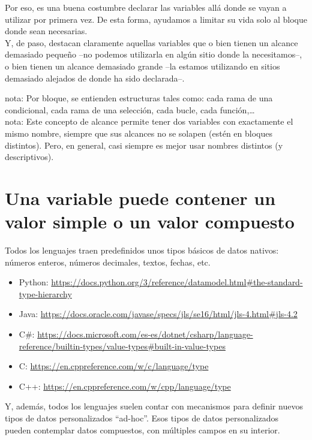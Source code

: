 \documentclass[spanish,12pt,a4paper,final,oneside]{book}
\begin{document}
\vspace{1cm}
Por eso, es una buena costumbre declarar las variables allá donde se vayan a utilizar por primera vez. De esta forma, ayudamos a limitar su vida solo al bloque donde sean necesarias. 
\\Y, de paso, destacan claramente aquellas variables que o bien tienen un alcance demasiado pequeño --no podemos utilizarla en algún sitio donde la necesitamos--, o bien tienen un alcance demasiado grande --la estamos utilizando en sitios demasiado alejados de donde ha sido declarada--.

nota: Por bloque, se entienden estructuras tales como: cada rama de una condicional, cada rama de una selección, cada bucle, cada función,\ldots
\\nota: Este concepto de alcance permite tener dos variables con exactamente el mismo nombre, siempre que sus alcances no se solapen (estén en bloques distintos). Pero, en general, casi siempre es mejor usar nombres distintos (y descriptivos).


\section{Una variable puede contener un valor simple o un valor compuesto}
Todos los lenguajes traen predefinidos unos tipos básicos de datos nativos: números enteros, números decimales, textos, fechas, etc.

\begin{itemize}
\item Python: \url{https://docs.python.org/3/reference/datamodel.html#the-standard-type-hierarchy}
\item Java: \url{https://docs.oracle.com/javase/specs/jls/se16/html/jls-4.html#jls-4.2}
\item C\#: \url{https://docs.microsoft.com/es-es/dotnet/csharp/language-reference/builtin-types/value-types#built-in-value-types}
\item C: \url{https://en.cppreference.com/w/c/language/type}
\item C++: \url{https://en.cppreference.com/w/cpp/language/type}
\end{itemize}

\vspace{0.5cm}
Y, además, todos los lenguajes suelen contar con mecanismos para definir nuevos tipos de datos personalizados ``ad-hoc''. Esos tipos de datos personalizados pueden contemplar datos compuestos, con múltiples campos en su interior.
\end{document}
